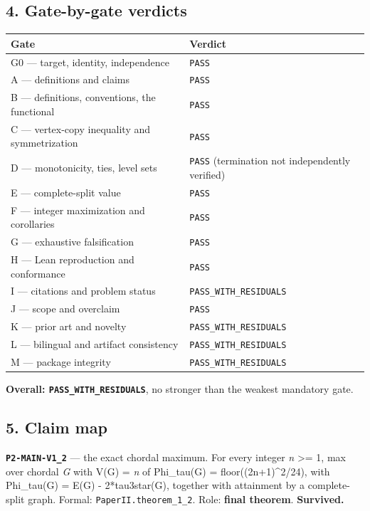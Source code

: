 \documentclass[
  9pt,
  a4paper,
]{article}
\newcounter{none} %
\begin{document}
\subsection{4. Gate-by-gate verdicts}\label{4-gate-by-gate-verdicts}

{\def\LTcaptype{none} %
\begin{longtable}[]{@{}ll@{}}
\toprule\noalign{}
Gate & Verdict \\
\midrule\noalign{}
\endhead
\bottomrule\noalign{}
\endlastfoot
G0 --- target, identity, independence & \texttt{PASS} \\
A --- definitions and claims & \texttt{PASS} \\
B --- definitions, conventions, the functional & \texttt{PASS} \\
C --- vertex-copy inequality and symmetrization & \texttt{PASS} \\
D --- monotonicity, ties, level sets & \texttt{PASS} (termination not
independently verified) \\
E --- complete-split value & \texttt{PASS} \\
F --- integer maximization and corollaries & \texttt{PASS} \\
G --- exhaustive falsification & \texttt{PASS} \\
H --- Lean reproduction and conformance & \texttt{PASS} \\
I --- citations and problem status & \texttt{PASS\_WITH\_RESIDUALS} \\
J --- scope and overclaim & \texttt{PASS} \\
K --- prior art and novelty & \texttt{PASS\_WITH\_RESIDUALS} \\
L --- bilingual and artifact consistency &
\texttt{PASS\_WITH\_RESIDUALS} \\
M --- package integrity & \texttt{PASS\_WITH\_RESIDUALS} \\
\end{longtable}
}

\textbf{Overall: \texttt{PASS\_WITH\_RESIDUALS}}, no stronger than the
weakest mandatory gate.

\subsection{5. Claim map}\label{5-claim-map}

\textbf{\texttt{P2-MAIN-V1\_2}} --- the exact chordal maximum. For every
integer \emph{n} \textgreater= 1, max over chordal \emph{G} with
\textbar V(G)\textbar{} = \emph{n} of Phi\_tau(G) =
floor((2n+1)\^{}2/24), with Phi\_tau(G) = \textbar E(G)\textbar{} -
2*tau3star(G), together with attainment by a complete-split graph.
Formal: \texttt{PaperII.theorem\_1\_2}. Role: \textbf{final theorem}.
\textbf{Survived.}
\end{document}

